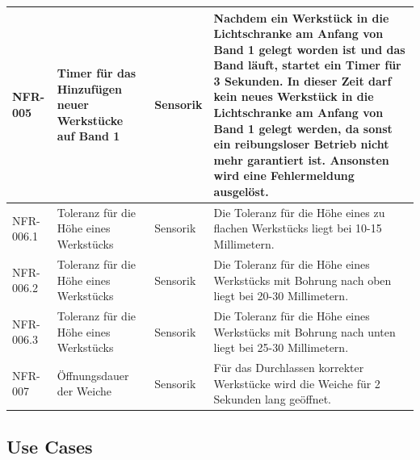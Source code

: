 \documentclass[oneside,a4paper,titlepage]{scrartcl} %
\begin{document}
\begin{small}
\begin{longtable}{|p{2cm}|p{4cm}|p{1.5cm}|p{5.5cm}|}
  \hline
  NFR-005 & Timer für das Hinzufügen neuer Werkstücke auf Band 1 & Sensorik & Nachdem ein Werkstück in die Lichtschranke am Anfang von Band 1 gelegt worden ist und das Band läuft, startet ein Timer für 3 Sekunden. In dieser Zeit darf kein neues Werkstück in die Lichtschranke am Anfang von Band 1 gelegt werden, da sonst ein reibungsloser Betrieb nicht mehr garantiert ist. Ansonsten wird eine Fehlermeldung ausgelöst.\\
  \hline
  \rowcolor{gray} NFR-006.1 & Toleranz für die Höhe eines Werkstücks & Sensorik & Die Toleranz für die Höhe eines zu flachen Werkstücks liegt bei 10-15 Millimetern.\\
  \hline
  \rowcolor{gray} NFR-006.2 & Toleranz für die Höhe eines Werkstücks & Sensorik & Die Toleranz für die Höhe eines Werkstücks mit Bohrung nach oben liegt bei 20-30 Millimetern.\\
  \hline
  \rowcolor{gray} NFR-006.3 & Toleranz für die Höhe eines Werkstücks & Sensorik & Die Toleranz für die Höhe eines Werkstücks mit Bohrung nach unten liegt bei 25-30 Millimetern.\\
  \hline
  NFR-007 & Öffnungsdauer der Weiche & Sensorik & Für das Durchlassen korrekter Werkstücke wird die Weiche für 2 Sekunden lang geöffnet.\\
  \hline
 \end{longtable} 
\end{small}

\newpage

\subsection{Use Cases}
\end{document}
